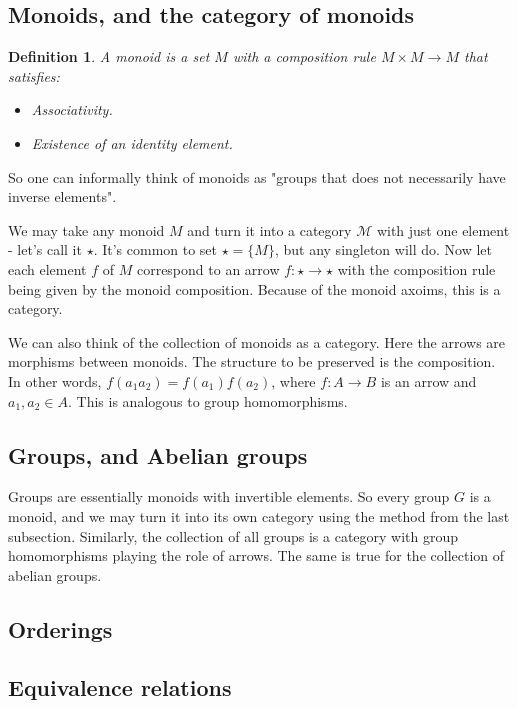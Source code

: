 \documentclass[12pt, a4paper]{article}
\newtheorem{definition}{Definition}[section]
\numberwithin{equation}{section}
\begin{document}
\subsection{Monoids, and the category of monoids}
\begin{definition}
A monoid is a set $M$ with a composition rule $M\times M\rightarrow M$ that satisfies:
\begin{itemize}
\item Associativity.
\item Existence of an identity element.
\end{itemize}
\end{definition}

So one can informally think of monoids as "groups that does not necessarily have inverse elements".

We may take any monoid $M$ and turn it into a category $\mathcal{M}$ with just one element - let's call it $\star$. It's common to set $\star=\{M\}$, but any singleton will do. Now let each element $f$ of $M$ correspond to an arrow $f:\star\rightarrow\star$ with the composition rule being given by the monoid composition. Because of the monoid axoims, this is a category.

We can also think of the collection of monoids as a category. Here the arrows are morphisms between monoids. The structure to be preserved is the composition. In other words, $f(a_1a_2)=f(a_1)f(a_2)$, where $f: A\rightarrow B$ is an arrow and $a_1,a_2\in A$. This is analogous to group homomorphisms.

\subsection{Groups, and Abelian groups}
Groups are essentially monoids with invertible elements. So every group $G$ is a monoid, and we may turn it into its own category using the method from the last subsection. Similarly, the collection of all groups is a category with group homomorphisms playing the role of arrows. The same is true for the collection of abelian groups.

\subsection{Orderings}

\subsection{Equivalence relations}
\end{document}
